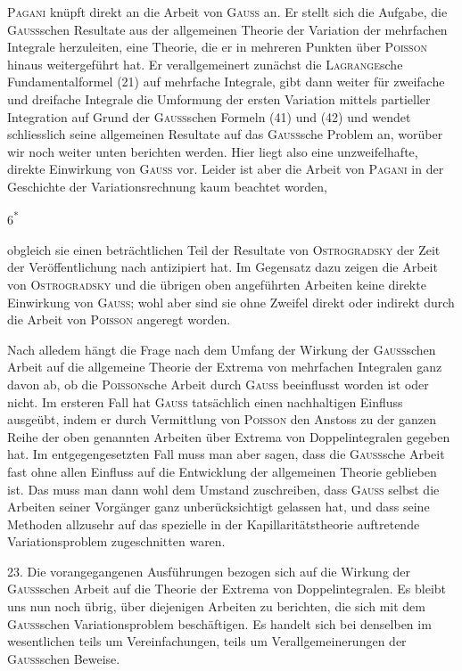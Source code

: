 \textsc{Pagani} knüpft direkt an die Arbeit von \textsc{Gauss} an. Er stellt sich die
Aufgabe, die \textsc{Gauss}schen Resultate aus der allgemeinen Theorie der Variation
der mehrfachen Integrale herzuleiten, eine Theorie, die er in mehreren Punkten
über \textsc{Poisson} hinaus weitergeführt hat. Er verallgemeinert zunächst die \textsc{Lagrange}sche
Fundamentalformel (21) auf mehrfache Integrale, gibt dann weiter
für zweifache und dreifache Integrale die Umformung der ersten Variation
mittels partieller Integration auf Grund der \textsc{Gauss}schen Formeln (41) und (42)
und wendet schliesslich seine allgemeinen Resultate auf das \textsc{Gauss}sche Problem
an, worüber wir noch weiter unten berichten werden. Hier liegt also eine
unzweifelhafte, direkte Einwirkung von \textsc{Gauss} vor. Leider ist aber die Arbeit
von \textsc{Pagani} in der Geschichte der Variationsrechnung kaum beachtet worden,
\par\smallskip\noindent\hfill{\small 6\textsuperscript{*}}\par
\clearpage{}
\noindent obgleich sie einen beträchtlichen Teil der Resultate von \textsc{Ostrogradsky} der
Zeit der Veröffentlichung nach antizipiert hat. Im Gegensatz dazu zeigen die
Arbeit von \textsc{Ostrogradsky} und die übrigen oben angeführten Arbeiten keine
direkte Einwirkung von \textsc{Gauss}; wohl aber sind sie ohne Zweifel direkt oder
indirekt durch die Arbeit von \textsc{Poisson} angeregt worden.

Nach alledem hängt die Frage nach dem Umfang der Wirkung der \textsc{Gauss}schen
Arbeit auf die allgemeine Theorie der Extrema von mehrfachen Integralen
ganz davon ab, ob die \textsc{Poisson}sche Arbeit durch \textsc{Gauss} beeinflusst
worden ist oder nicht. Im ersteren Fall hat \textsc{Gauss} tatsächlich einen nachhaltigen
Einfluss ausgeübt, indem er durch Vermittlung von \textsc{Poisson} den Anstoss
zu der ganzen Reihe der oben genannten Arbeiten über Extrema von
Doppelintegralen gegeben hat. Im entgegengesetzten Fall muss man aber
sagen, dass die \textsc{Gauss}sche Arbeit fast ohne allen Einfluss auf die Entwicklung
der allgemeinen Theorie geblieben ist. Das muss man dann wohl dem Umstand
zuschreiben, dass \textsc{Gauss} selbst die Arbeiten seiner Vorgänger ganz
unberücksichtigt gelassen hat, und dass seine Methoden allzusehr auf das
spezielle in der Kapillaritätstheorie auftretende Variationsproblem zugeschnitten
waren.

23. Die vorangegangenen Ausführungen bezogen sich auf die Wirkung
der \textsc{Gauss}schen Arbeit auf die  Theorie der Extrema von Doppelintegralen.
Es bleibt uns nun noch übrig, über diejenigen Arbeiten zu berichten,
die sich mit dem  \textsc{Gauss}schen Variationsproblem beschäftigen.
Es handelt sich bei denselben im wesentlichen teils um Vereinfachungen,
teils um Verallgemeinerungen der \textsc{Gauss}schen Beweise.

